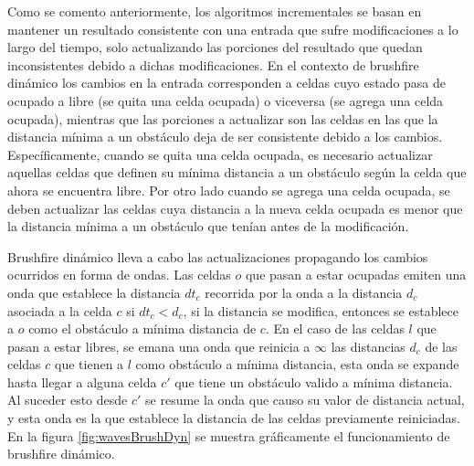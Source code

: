 Como se comento anteriormente, los algoritmos incrementales se basan en
mantener un resultado consistente con una entrada que sufre modificaciones a lo
largo del tiempo, solo actualizando las porciones del resultado que quedan
inconsistentes debido a dichas modificaciones.
En el contexto de brushfire dinámico los cambios en la entrada
corresponden a celdas cuyo estado pasa de ocupado a libre (se quita una
celda ocupada) o viceversa (se agrega una celda ocupada), mientras que las
porciones a actualizar son las celdas en las que la distancia
mínima a un obstáculo deja de ser consistente debido a los cambios.
Específicamente, cuando se quita una celda ocupada, es necesario actualizar
aquellas celdas que definen su mínima distancia a un obstáculo según la
celda que ahora se encuentra libre. 
Por otro lado cuando se agrega una celda ocupada, se deben actualizar las celdas 
cuya distancia a la nueva celda ocupada es menor que la distancia mínima a un
obstáculo que tenían antes de la modificación.

Brushfire dinámico lleva a cabo las actualizaciones propagando los cambios ocurridos
en forma de ondas. Las celdas $o$ que pasan a estar ocupadas emiten una onda
 que establece la distancia $dt_c$ recorrida por la onda a la
distancia $d_c$ asociada a la celda $c$ si $dt_{c}<d_{c}$, si la distancia se
modifica, entonces se establece a $o$ como el obstáculo a mínima distancia de $c$. En el
caso de las celdas $l$ que pasan a estar libres, se emana una onda
 que reinicia a $\infty$ las distancias $d_c$ de las celdas
$c$ que tienen a $l$ como obstáculo a mínima distancia, esta onda se expande
hasta llegar a alguna celda $c'$ que tiene un obstáculo valido a mínima
distancia. Al suceder esto desde $c'$ se resume la onda  que
causo su valor de distancia actual, y esta onda es la que establece la
distancia de las celdas previamente reiniciadas. En la figura
\ref{fig:wavesBrushDyn} se muestra gráficamente el funcionamiento de brushfire
dinámico.

